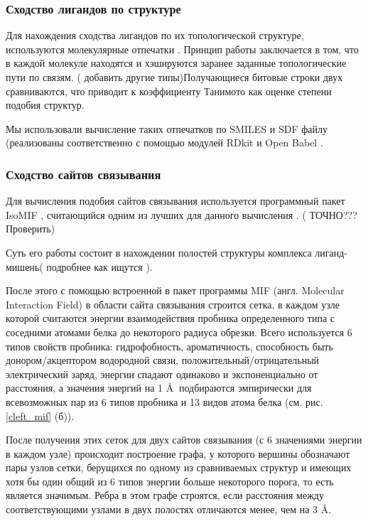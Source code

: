 \documentclass[a4paper,14pt]{article}         %
\begin{document}
\subsubsection{Сходство лигандов по структуре}
Для нахождения сходства лигандов по их топологической структуре, используются молекулярные отпечатки \cite{Cereto-Massague2015}. Принцип работы заключается в том, что в каждой молекуле находятся и хэшируются заранее заданные топологические пути по связям. (\color{orange} добавить другие типы\color{black})Получающиеся битовые строки двух сравниваются, что приводит к коэффициенту Танимото как оценке степени подобия структур.

Мы использовали вычисление таких отпечатков по SMILES и SDF файлу (реализованы соответственно с помощью модулей RDkit \cite{rdkit} и Open Babel \cite{openbabel}.

\subsubsection{Сходство сайтов связывания}
Для вычисления подобия сайтов связывания используется программный пакет IsoMIF \cite{isomif, Chartier2015}, считающийся одним из лучших для данного вычисления \cite{Ehrt2016}. (\color{orange} ТОЧНО??? Проверить\color{black})

Суть его работы состоит в нахождении полостей структуры комплекса лиганд-мишень\cite{Gaudreault2015, Laskowski1995}(\color{orange} подробнее как ищутся \color{black}). 

После этого с помощью встроенной в пакет программы MIF (англ. Molecular Interaction Field) в области сайта связывания строится сетка, в каждом узле которой считаются энергии взаимодействия пробника определенного типа с соседними атомами белка до некоторого радиуса обрезки. Всего используется 6 типов свойств пробника: гидрофобность, ароматичность, способность быть донором/акцептором водородной связи, положительный/отрицательный электрический заряд, энергии спадают одинаково и экспоненциально от расстояния, а значения энергий на 1 \AA $\:$ подбираются эмпирически для всевозможных пар из 6 типов пробника и 13 видов атома белка (см. рис. \ref{cleft_mif} (б)).

После получения этих сеток для двух сайтов связывания (с 6 значениями энергии в каждом узле) происходит построение графа, у которого вершины обозначают пары узлов сетки, берущихся по одному из сравниваемых структур и имеющих хотя бы один общий из 6 типов энергии больше некоторого порога, то есть является значимым. Ребра в этом графе строятся, если расстояния между соответствующими узлами в двух полостях отличаются менее, чем на 3 \AA. 
\end{document}
